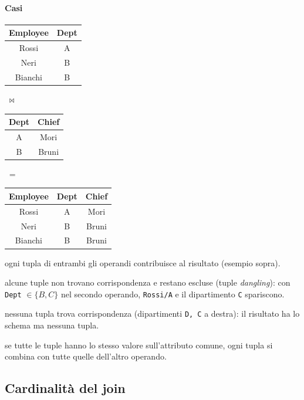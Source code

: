 \documentclass[a4paper,12pt]{article}
\begin{document}
\paragraph{Casi}
\begin{center}
\begin{tabular}{cc}
\hline Employee & Dept\\ \hline
Rossi & A\\ Neri & B\\ Bianchi & B\\ \hline
\end{tabular}
$\;\bowtie\;$
\begin{tabular}{cc}
\hline Dept & Chief\\ \hline
A & Mori\\ B & Bruni\\ \hline
\end{tabular}
$\;=\;$
\begin{tabular}{ccc}
\hline Employee & Dept & Chief\\ \hline
Rossi & A & Mori\\ Neri & B & Bruni\\ Bianchi & B & Bruni\\ \hline
\end{tabular}
\end{center}
\begin{description}[style=nextline]
  \item[Join completo] ogni tupla di entrambi gli operandi contribuisce al
    risultato (esempio sopra).
  \item[Join non completo] alcune tuple non trovano corrispondenza e restano
    escluse (tuple \emph{dangling}): con \texttt{Dept} $\in \{B, C\}$ nel
    secondo operando, \texttt{Rossi/A} e il dipartimento \texttt{C} spariscono.
  \item[Join vuoto] nessuna tupla trova corrispondenza (dipartimenti
    \texttt{D, C} a destra): il risultato ha lo schema ma nessuna tupla.
  \item[Join con $n \times m$ tuple] se tutte le tuple hanno lo stesso valore
    sull'attributo comune, ogni tupla si combina con tutte quelle dell'altro
    operando.
\end{description}

\subsection{Cardinalità del join}
\end{document}
